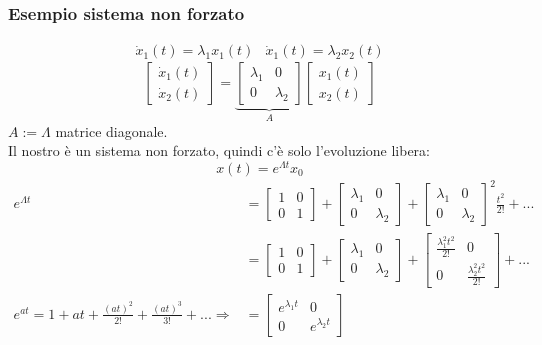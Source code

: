 \documentclass{article}
\begin{document}
\subsubsection{Esempio sistema non forzato}
\begin{align*}
    \dot x_1(t) = \lambda_1 x_1(t) & \dot x_1(t) = \lambda_2 x_2(t)
\end{align*}
\[
    \begin{bmatrix}
        \dot x_1(t)\\
        \dot x_2(t)
    \end{bmatrix}
    =
    \underbrace{\begin{bmatrix}
        \lambda_1 & 0\\
        0 & \lambda_2  
    \end{bmatrix}}_{A}
    \begin{bmatrix}
        x_1(t)\\
        x_2(t)
    \end{bmatrix}
\]
$A := \Lambda$ matrice diagonale.
\vspace*{0.2cm}\\
Il nostro è un sistema non forzato, quindi c'è solo l'evoluzione libera:
\[
    x(t) = e^{\Lambda t}x_0
\]
\begin{align*}
    e^{\Lambda t} &= 
    \begin{bmatrix}
        1 & 0\\
        0 & 1
    \end{bmatrix}
    +
    \begin{bmatrix}
        \lambda_1 & 0\\
        0 & \lambda_2
    \end{bmatrix}
    +
    \begin{bmatrix}
        \lambda_1 & 0\\
        0 & \lambda_2
    \end{bmatrix}^2 \frac{t^2}{2!} + ...\\
    &=\begin{bmatrix}
        1 & 0\\
        0 & 1
    \end{bmatrix}
    +
    \begin{bmatrix}
        \lambda_1 & 0\\
        0 & \lambda_2
    \end{bmatrix}
    +
    \begin{bmatrix}
        \frac{\lambda_1^2 t^2}{2!} & 0\\
        0 & \frac{\lambda_2^2 t^2}{2!}
    \end{bmatrix} + ...\\
    e^{at} = 1 + at + \frac{(at)^2}{2!} + \frac{(at)^3}{3!} + ... \Longrightarrow&=
    \begin{bmatrix}
        e^{\lambda_1 t} & 0\\
        0 & e^{\lambda_2 t}
    \end{bmatrix}
\end{align*}
\end{document}
